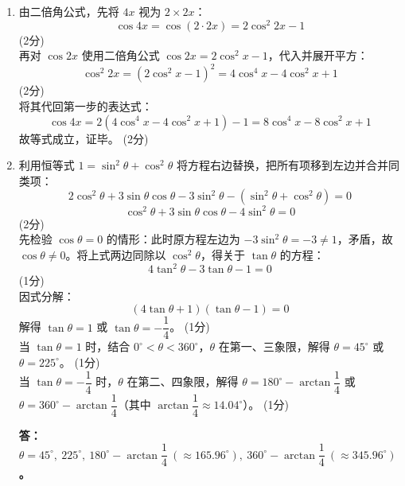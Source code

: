 \documentclass[12pt,a4paper]{exam-zh}
\begin{document}
\begin{solution}
    \begin{enumerate}[label=(\alph*)]
        \item 由二倍角公式，先将 $4x$ 视为 $2\times 2x$： \\
        \[ \displaystyle \cos 4x = \cos(2\cdot 2x) = 2\cos^{2}2x - 1 \] \hfill (2分) \\
        再对 $\cos 2x$ 使用二倍角公式 $\cos 2x = 2\cos^{2}x - 1$，代入并展开平方： \\
        \[ \displaystyle \cos^{2}2x = (2\cos^{2}x - 1)^{2} = 4\cos^{4}x - 4\cos^{2}x + 1 \] \hfill (2分) \\
        将其代回第一步的表达式： \\
        \[ \displaystyle \cos 4x = 2(4\cos^{4}x - 4\cos^{2}x + 1) - 1 = 8\cos^{4}x - 8\cos^{2}x + 1 \]
        故等式成立，证毕。 \hfill (2分)

        \item 利用恒等式 $1 = \sin^{2}\theta + \cos^{2}\theta$ 将方程右边替换，把所有项移到左边并合并同类项： \\
        \[ \displaystyle 2\cos^{2}\theta + 3\sin\theta\cos\theta - 3\sin^{2}\theta - (\sin^{2}\theta + \cos^{2}\theta) = 0 \]
        \[ \displaystyle \cos^{2}\theta + 3\sin\theta\cos\theta - 4\sin^{2}\theta = 0 \] \hfill (2分) \\
        先检验 $\cos\theta = 0$ 的情形：此时原方程左边为 $-3\sin^{2}\theta = -3 \neq 1$，矛盾，故 $\cos\theta \neq 0$。将上式两边同除以 $\cos^{2}\theta$，得关于 $\tan\theta$ 的方程： \\
        \[ \displaystyle 4\tan^{2}\theta - 3\tan\theta - 1 = 0 \] \hfill (1分) \\
        因式分解： \\
        \[ \displaystyle (4\tan\theta + 1)(\tan\theta - 1) = 0 \]
        解得 $\tan\theta = 1$ 或 $\tan\theta = -\dfrac{1}{4}$。 \hfill (1分) \\
        当 $\tan\theta = 1$ 时，结合 $0^{\circ} < \theta < 360^{\circ}$，$\theta$ 在第一、三象限，解得 $\theta = 45^{\circ}$ 或 $\theta = 225^{\circ}$。 \hfill (1分) \\
        当 $\tan\theta = -\dfrac{1}{4}$ 时，$\theta$ 在第二、四象限，解得 $\theta = 180^{\circ} - \arctan\dfrac{1}{4}$ 或 $\theta = 360^{\circ} - \arctan\dfrac{1}{4}$（其中 $\arctan\dfrac{1}{4} \approx 14.04^{\circ}$）。 \hfill (1分)

        \textbf{答：$\theta = 45^{\circ},\ 225^{\circ},\ 180^{\circ}-\arctan\dfrac{1}{4}\ (\approx 165.96^{\circ}),\ 360^{\circ}-\arctan\dfrac{1}{4}\ (\approx 345.96^{\circ})$。}
    \end{enumerate}
\end{solution}
\end{document}
